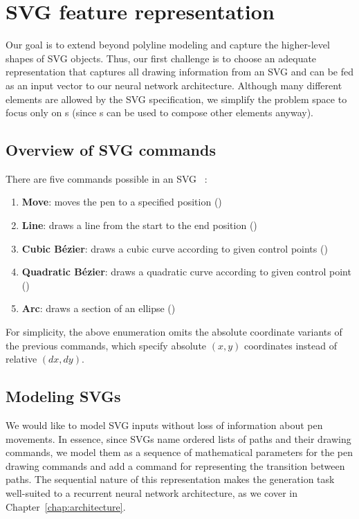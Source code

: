 \chapter{SVG feature representation}
Our goal is to extend beyond polyline modeling and capture the higher-level shapes of SVG objects.
Thus, our first challenge is to choose an adequate representation that captures all drawing information from an SVG and can be fed as an input vector to our neural network architecture.
Although many different elements are allowed by the SVG specification, we simplify the problem space to focus only on s (since s can be used to compose other elements anyway). 

\section{Overview of SVG commands}
There are five commands possible in an SVG ~\cite{grasso2011svg}:

\begin{enumerate}
    \item \textbf{Move}: moves the pen to a specified position ()
    \item \textbf{Line}: draws a line from the start to the end position ()
    \item \textbf{Cubic B\'ezier}: draws a cubic curve according to given control points ()
    \item \textbf{Quadratic B\'ezier}: draws a quadratic curve according to given control point ()
    \item \textbf{Arc}: draws a section of an ellipse ()
\end{enumerate}

For simplicity, the above enumeration omits the absolute coordinate variants of the previous commands, which specify absolute $(x, y)$ coordinates instead of relative $(dx, dy)$.

\section{Modeling SVGs}
We would like to model SVG inputs without loss of information about pen movements.
In essence, since SVGs name ordered lists of paths and their drawing commands, we model them as a sequence of mathematical parameters for the pen drawing commands and add a command for representing the transition between paths.
The sequential nature of this representation makes the generation task well-suited to a recurrent neural network architecture, as we cover in Chapter~\ref{chap:architecture}.

